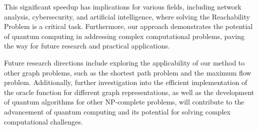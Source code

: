 This significant speedup has implications for various fields, including network analysis, cybersecurity, and artificial intelligence, where solving the Reachability Problem is a critical task. Furthermore, our approach demonstrates the potential of quantum computing in addressing complex computational problems, paving the way for future research and practical applications.

Future research directions include exploring the applicability of our method to other graph problems, such as the shortest path problem and the maximum flow problem. Additionally, further investigation into the efficient implementation of the oracle function for different graph representations, as well as the development of quantum algorithms for other NP-complete problems, will contribute to the advancement of quantum computing and its potential for solving complex computational challenges.

